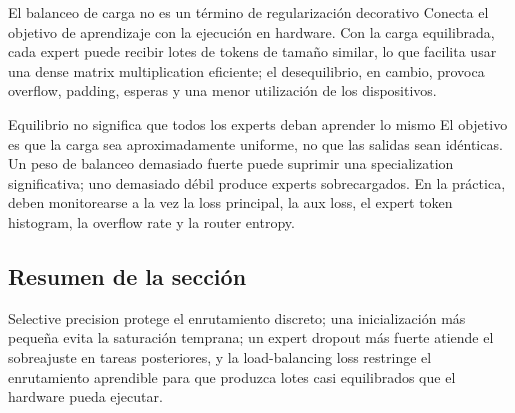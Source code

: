 
\begin{importantbox}{El balanceo de carga no es un término de regularización decorativo}
Conecta el objetivo de aprendizaje con la ejecución en hardware. Con la carga equilibrada, cada expert puede recibir lotes de tokens de tamaño similar, lo que facilita usar una dense matrix multiplication eficiente; el desequilibrio, en cambio, provoca overflow, padding, esperas y una menor utilización de los dispositivos.
\end{importantbox}

\begin{warningbox}{Equilibrio no significa que todos los experts deban aprender lo mismo}
El objetivo es que la carga sea aproximadamente uniforme, no que las salidas sean idénticas. Un peso de balanceo demasiado fuerte puede suprimir una specialization significativa; uno demasiado débil produce experts sobrecargados. En la práctica, deben monitorearse a la vez la loss principal, la aux loss, el expert token histogram, la overflow rate y la router entropy.
\end{warningbox}

\subsection{Resumen de la sección}

Selective precision protege el enrutamiento discreto; una inicialización más pequeña evita la saturación temprana; un expert dropout más fuerte atiende el sobreajuste en tareas posteriores, y la load-balancing loss restringe el enrutamiento aprendible para que produzca lotes casi equilibrados que el hardware pueda ejecutar.
